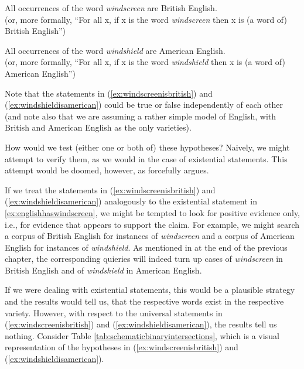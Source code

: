\begin{exe}
\ex All occurrences of the word \textit{windscreen} are British English. \\
(or, more formally, ``For all x, if x is the word \textit{windscreen} then x is (a word of) British English'')
\label{ex:windscreenisbritish}
\end{exe}

\begin{exe}
\ex All occurrences of the word \textit{windshield} are American English.\\
(or, more formally, ``For all x, if x is the word \textit{windshield} then x is (a word of) American English'')
\label{ex:windshieldisamerican}
\end{exe}

Note that the statements in (\ref{ex:windscreenisbritish}) and (\ref{ex:windshieldisamerican}) could be true or false independently of each other (and note also that we are assuming a rather simple model of English, with British and American English as the only varieties).

How would we test (either one or both of) these hypotheses? Naively, we might attempt to verify them, as we would in the case of existential statements. This attempt would be doomed, however, as \citet{popper_conjectures_1963} forcefully argues.

If we treat the statements in (\ref{ex:windscreenisbritish}) and (\ref{ex:windshieldisamerican}) analogously to the existential statement in \ref{ex:englishhaswindscreen}, we might be tempted to look for positive evidence only, i.e., for evidence that appears to support the claim. For example, we might search a corpus of British English for instances of \textit{windscreen} and a corpus of American English for instances of \textit{windshield}. As mentioned in at the end of the previous chapter, the corresponding quieries will indeed turn up cases of \textit{windscreen} in British English and of \textit{windshield} in American English.

If we were dealing with existential statements, this would be a plausible strategy and the results would tell us, that the respective words exist in the respective variety. However, with respect to the universal statements in (\ref{ex:windscreenisbritish}) and (\ref{ex:windshieldisamerican}), the results tell us nothing. Consider Table \ref{tab:schematicbinaryintersections}, which is a visual representation of the hypotheses in (\ref{ex:windscreenisbritish}) and (\ref{ex:windshieldisamerican}).

